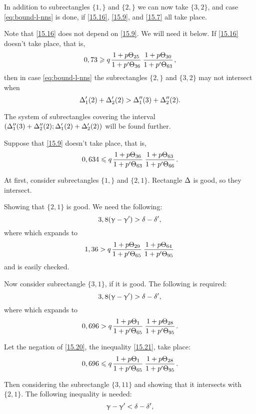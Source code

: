 In addition to subrectangles $\{1,\}$ and $\{2,\}$ we can now take $\{3, 2\}$,
and case \ref{eq:bound-l-nns} is done, if \ref{15.16}, \ref{15.9}, and \ref{15.7} all take place.

Note that \ref{15.16} does not depend on \ref{15.9}.
We will need it below.
If \ref{15.16} doesn't take place, that is,
\begin{equation}\label{15.18}
	0,73 \geqslant q \up{25}{36} \up{30}{63},
\end{equation}
then in case \ref{eq:bound-l-nns} the subrectangles $\{2,\}$ and $\{3, 2\}$ may not intersect when
\begin{equation*}
	\Delta_1'(2) + \Delta_2'(2) > \Delta_1''(3) + \Delta_2''(2).
\end{equation*}

The system of subrectangles covering the interval $\left(\Delta_1''(3) + \Delta_2''(2); \Delta_1'(2) + \Delta_2'(2)\right)$
will be found further.

Suppose that \ref{15.9} doesn't take place, that is,
\begin{equation}\label{15.19}
	0,634 \leqslant q \up{36}{63} \up{63}{66}.
\end{equation}

At first, consider subrectangles $\{1,\}$ and $\{2, 1\}$.
Rectangle $\Delta$ is good, so they intersect.

Showing that $\{2, 1\}$ is good.
We need the following:
\begin{equation}
	3,8 (\upgamma - \upgamma') > \delta - \delta',
\end{equation}
where
which expands to
\begin{equation*}
	1,36 > q \up{29}{65} \up{64}{95}
\end{equation*}
and is easily checked.

Now consider subrectangle $\{3, 1\}$, if it is good.
The following is required:
\begin{equation*}
	3,8 (\upgamma - \upgamma') > \delta - \delta',
\end{equation*}
where
which expands to
\begin{equation}\label{15.20}
	0,696 > q \up{1}{65} \up{28}{95}.
\end{equation}

Let the negation of \ref{15.20}, the inequality \ref{15.21}, take place:
\begin{equation}\label{15.21}
	0,696 \leqslant q \up{1}{65} \up{28}{95}.
\end{equation}

Then considering the subrectangle $\{3, 11\}$ and showing that it intersects with $\{2, 1\}$.
The following inequality is needed:
\begin{equation}\label{15.22}
	\upgamma - \upgamma' < \delta - \delta',
\end{equation}

